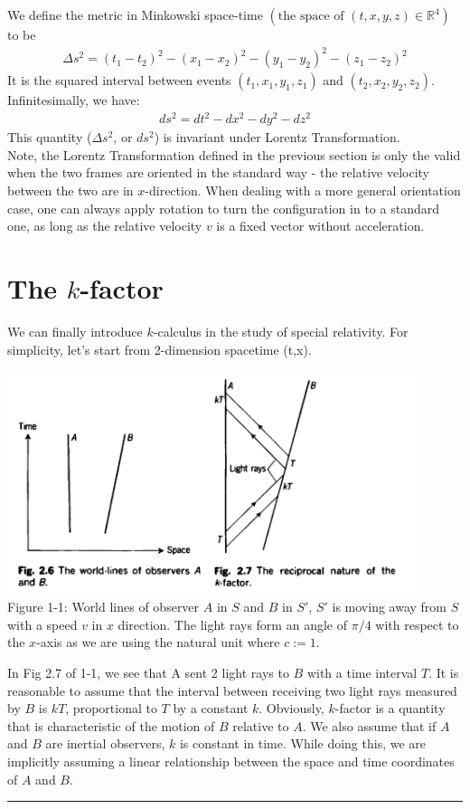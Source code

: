 \documentclass[9pt,oneside,headheight=10mm]{book}
\newcommand{\cb}[1]{\left(#1\right)}
\begin{document}
	We define the metric in Minkowski space-time $\cb{\text{the space of } (t,x,y,z)\in\mathbb{R}^4}$ to be
	\begin{align*}
	\Delta s^2 = (t_1-t_2)^2 - (x_1-x_2)^2 - (y_1-y_2)^2 - (z_1-z_2)^2
	\end{align*}
	It is the squared interval between events $(t_1, x_1, y_1, z_1)$ and $(t_2, x_2, y_2, z_2)$. Infinitesimally, we have:
	\begin{align*}
	ds^2 = dt^2 - dx^2 - dy^2-dz^2
	\end{align*}
	This quantity ($\Delta s^2$, or $ds^2$) is invariant under Lorentz Transformation.\\
	Note, the Lorentz Transformation defined in the previous section is only the valid when the two frames are oriented in the standard way - the relative velocity between the two are in $x$-direction. When dealing with a more general orientation case, one can always apply rotation to turn the configuration in to a standard one, as long as the relative velocity $v$ is a fixed vector without acceleration.
	
	\section{The $k$-factor}
	We can finally introduce $k$-calculus in the study of special relativity. For simplicity, let's start from 2-dimension spacetime (t,x).
	\begin{center}
	\includegraphics[width=12cm]{Chap1/1-1}\\
	Figure 1-1: World lines of observer $A$ in $S$ and $B$ in $S'$, $S'$ is moving away from $S$ with a speed $v$ in $x$ direction. The light rays form an angle of $\pi/4$ with respect to the $x$-axis as we are using the natural unit where $c:=1$.
	\end{center}
	
	In Fig 2.7 of 1-1, we see that A sent 2 light rays to $B$ with a time interval $T$. It is reasonable to assume that the interval between receiving two light rays measured by $B$ is $kT$, proportional to $T$ by a constant $k$. Obviously, $k$-factor is a quantity that is characteristic of the motion of $B$ relative to $A$. We also assume that if $A$ and $B$ are inertial observers, $k$ is constant in time. While doing this, we are implicitly assuming a linear relationship between the space and time coordinates of $A$ and $B$.\\\rule{\linewidth}{0.65pt}
	
\end{document}

